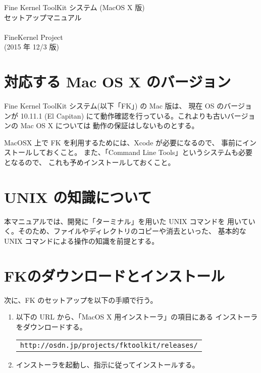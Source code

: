 \documentclass[a4paper]{jsarticle}
\begin{document}
\begin{center}
{\LARGE Fine Kernel ToolKit システム (MacOS X 版) \\
	セットアップマニュアル} \\ ~ \\
{\Large FineKernel Project} \\
(2015 年 12/3 版)
\end{center}

\section{対応する Mac OS X のバージョン}
Fine Kernel ToolKit システム(以下「FK」) の Mac 版は、
現在 OS のバージョンが 10.11.1 (El Capitan)
にて動作確認を行っている。これよりも古いバージョンの Mac OS X については
動作の保証はしないものとする。

MacOSX 上で FK を利用するためには、Xcode が必要になるので、
事前にインストールしておくこと。
また、「Command Line Tools」というシステムも必要となるので、
これも予めインストールしておくこと。

\section{UNIX の知識について}
本マニュアルでは、開発に「ターミナル」を用いた UNIX コマンドを
用いていく。そのため、ファイルやディレクトリのコピーや消去といった、
基本的な UNIX コマンドによる操作の知識を前提とする。

\section{FKのダウンロードとインストール}
次に、FK のセットアップを以下の手順で行う。
\begin{enumerate}
\item 以下の URL から、「MacOS X 用インストーラ」の項目にある
	インストーラをダウンロードする。
	\begin{center}
	\begin{tabular}{c}
	\verb+http://osdn.jp/projects/fktoolkit/releases/+
	\end{tabular}
	\end{center}

\item インストーラを起動し、指示に従ってインストールする。
\end{enumerate}
\end{document}
